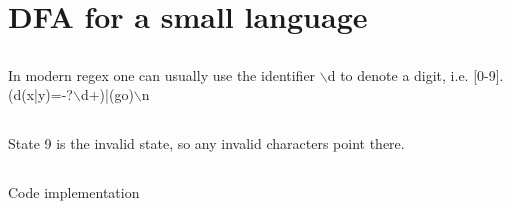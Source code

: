 \documentclass{article}
\begin{document}
\section{DFA for a small language}
\subsection{}
In modern regex one can usually use the identifier $\backslash$d to denote a digit, i.e. [0-9].\\
(d(x|y)=-?$\backslash$d+)|(go)$\backslash$n

\subsection{}
State 9 is the invalid state, so any invalid characters point there.\\
\subsection{}
Code implementation
\end{document}
